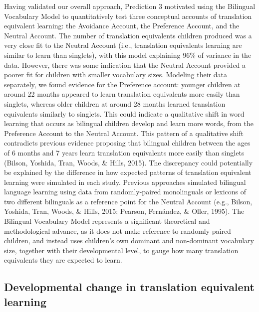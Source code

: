 \documentclass[
  english,
  ,man,floatsintext]{apa6}
\begin{document}
Having validated our overall approach, Prediction 3 motivated using the Bilingual Vocabulary Model to quantitatively test three conceptual accounts of translation equivalent learning: the Avoidance Account, the Preference Account, and the Neutral Account. The number of translation equivalents children produced was a very close fit to the Neutral Account (i.e., translation equivalents learning are similar to learn than singlets), with this model explaining 96\% of variance in the data. However, there was some indication that the Neutral Account provided a poorer fit for children with smaller vocabulary sizes. Modeling their data separately, we found evidence for the Preference account: younger children at around 22 months appeared to learn translation equivalents more easily than singlets, whereas older children at around 28 months learned translation equivalents similarly to singlets. This could indicate a qualitative shift in word learning that occurs as bilingual children develop and learn more words, from the Preference Account to the Neutral Account. This pattern of a qualitative shift contradicts previous evidence proposing that bilingual children between the ages of 6 months and 7 years learn translation equivalents more easily than singlets (Bilson, Yoshida, Tran, Woods, \& Hills, 2015). The discrepancy could potentially be explained by the difference in how expected patterns of translation equivalent learning were simulated in each study. Previous approaches simulated bilingual language learning using data from randomly-paired monolinguals or lexicons of two different bilinguals as a reference point for the Neutral Account (e.g., Bilson, Yoshida, Tran, Woods, \& Hills, 2015; Pearson, Fernández, \& Oller, 1995). The Bilingual Vocabulary Model represents a significant theoretical and methodological advance, as it does not make reference to randomly-paired children, and instead uses children's own dominant and non-dominant vocabulary size, together with their developmental level, to gauge how many translation equivalents they are expected to learn.

\hypertarget{developmental-change-in-translation-equivalent-learning}{%
\subsection{Developmental change in translation equivalent learning}\label{developmental-change-in-translation-equivalent-learning}}
\end{document}
